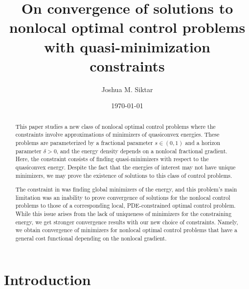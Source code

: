 \documentclass[11pt, reqno]{amsart}   	%
\title{On convergence of solutions to nonlocal optimal control problems with quasi-minimization constraints}
\author{Joshua M. Siktar}
\date{\today}							%
\theoremstyle{plain}
\numberwithin{equation}{section}
\def\de{\delta}
\begin{document}
\maketitle


\begin{abstract}
This paper studies a new class of nonlocal optimal control problems where the constraints involve approximations of minimizers of quasiconvex energies. These problems are parameterized by a fractional parameter $s \in (0, 1)$ and a horizon parameter $\de > 0$, and the energy density depends on a nonlocal fractional gradient. Here, the constraint consists of finding quasi-minimizers with respect to the quasiconvex energy. Despite the fact that the energies of interest may not have unique minimizers, we may prove the existence of solutions to this class of control problems. 

The constraint in \cite{cueto2026localization} was finding global minimizers of the energy, and this problem's main limitation was an inability to prove convergence of solutions for the nonlocal control problems to those of a corresponding local, PDE-constrained optimal control problem. While this issue arises from the lack of uniqueness of minimizers for the constraining energy, we get stronger convergence results with our new choice of constraints. Namely, we obtain convergence of minimizers for nonlocal optimal control problems that have a general cost functional depending on the nonlocal gradient.

\end{abstract}


\section{Introduction}\label{Sec: intro}

\end{document}
